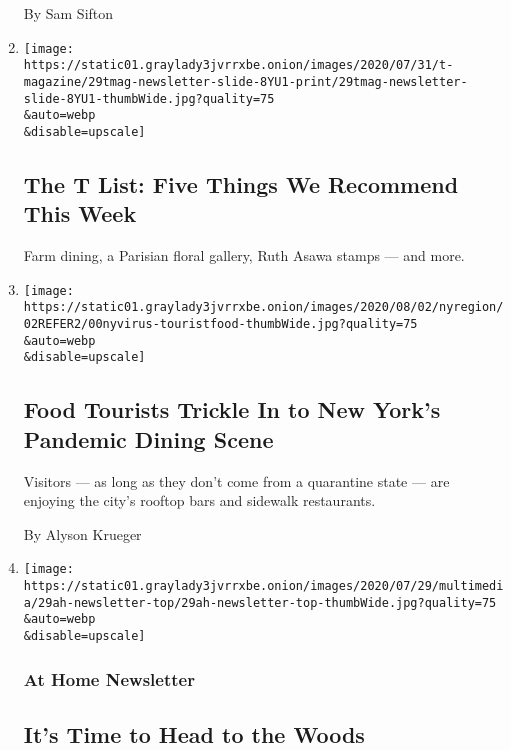 \begin{enumerate}
  By Sam Sifton
\item
  \href{/2020/07/30/t-magazine/the-t-list-five-things-we-recommend-this-week.html}{}

  \texttt{[image: https://static01.graylady3jvrrxbe.onion/images/2020/07/31/t-magazine/29tmag-newsletter-slide-8YU1-print/29tmag-newsletter-slide-8YU1-thumbWide.jpg?quality=75\\\&auto=webp\\\&disable=upscale]}

  \hypertarget{the-t-list-five-things-we-recommend-this-week}{%
  \subsection{The T List: Five Things We Recommend This
  Week}\label{the-t-list-five-things-we-recommend-this-week}}

  Farm dining, a Parisian floral gallery, Ruth Asawa stamps --- and
  more.
\item
  \href{/2020/07/30/nyregion/coronavirus-nyc-tourism-restaurants.html}{}

  \texttt{[image: https://static01.graylady3jvrrxbe.onion/images/2020/08/02/nyregion/02REFER2/00nyvirus-touristfood-thumbWide.jpg?quality=75\\\&auto=webp\\\&disable=upscale]}

  \hypertarget{food-tourists-trickle-in-to-new-yorks-pandemic-dining-scene}{%
  \subsection{Food Tourists Trickle In to New York's Pandemic Dining
  Scene}\label{food-tourists-trickle-in-to-new-yorks-pandemic-dining-scene}}

  Visitors --- as long as they don't come from a quarantine state ---
  are enjoying the city's rooftop bars and sidewalk restaurants.

  By Alyson Krueger
\item
  \href{/2020/07/29/at-home/newsletter.html}{}

  \texttt{[image: https://static01.graylady3jvrrxbe.onion/images/2020/07/29/multimedia/29ah-newsletter-top/29ah-newsletter-top-thumbWide.jpg?quality=75\\\&auto=webp\\\&disable=upscale]}

  \hypertarget{at-home-newsletter-1}{%
  \subsubsection{At Home Newsletter}\label{at-home-newsletter-1}}

  \hypertarget{its-time-to-head-to-the-woods}{%
  \subsection{It's Time to Head to the
  Woods}\label{its-time-to-head-to-the-woods}}


\end{enumerate}
